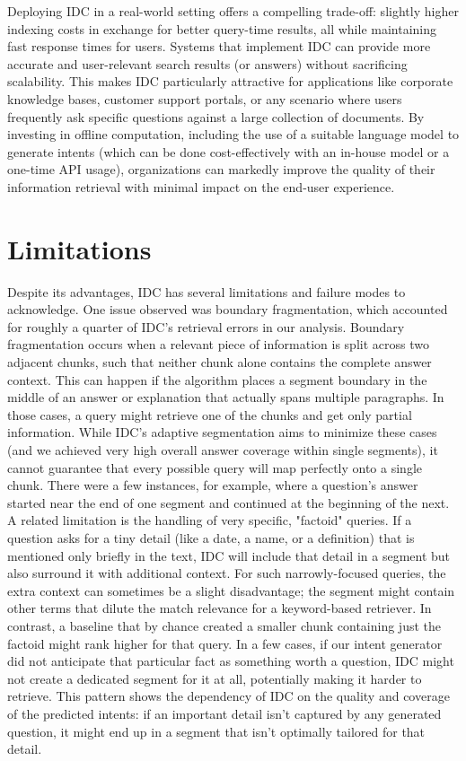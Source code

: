 \documentclass[12pt,a4paper]{report}
\begin{document}
Deploying IDC in a real-world setting offers a compelling trade-off: slightly higher indexing costs in exchange for better query-time results, all while maintaining fast response times for users. Systems that implement IDC can provide more accurate and user-relevant search results (or answers) without sacrificing scalability. This makes IDC particularly attractive for applications like corporate knowledge bases, customer support portals, or any scenario where users frequently ask specific questions against a large collection of documents. By investing in offline computation, including the use of a suitable language model to generate intents (which can be done cost-effectively with an in-house model or a one-time API usage), organizations can markedly improve the quality of their information retrieval with minimal impact on the end-user experience.

\section{Limitations}

Despite its advantages, IDC has several limitations and failure modes to acknowledge. One issue observed was boundary fragmentation, which accounted for roughly a quarter of IDC's retrieval errors in our analysis. Boundary fragmentation occurs when a relevant piece of information is split across two adjacent chunks, such that neither chunk alone contains the complete answer context. This can happen if the algorithm places a segment boundary in the middle of an answer or explanation that actually spans multiple paragraphs. In those cases, a query might retrieve one of the chunks and get only partial information. While IDC's adaptive segmentation aims to minimize these cases (and we achieved very high overall answer coverage within single segments), it cannot guarantee that every possible query will map perfectly onto a single chunk. There were a few instances, for example, where a question's answer started near the end of one segment and continued at the beginning of the next. A related limitation is the handling of very specific, "factoid" queries. If a question asks for a tiny detail (like a date, a name, or a definition) that is mentioned only briefly in the text, IDC will include that detail in a segment but also surround it with additional context. For such narrowly-focused queries, the extra context can sometimes be a slight disadvantage; the segment might contain other terms that dilute the match relevance for a keyword-based retriever. In contrast, a baseline that by chance created a smaller chunk containing just the factoid might rank higher for that query. In a few cases, if our intent generator did not anticipate that particular fact as something worth a question, IDC might not create a dedicated segment for it at all, potentially making it harder to retrieve. This pattern shows the dependency of IDC on the quality and coverage of the predicted intents: if an important detail isn't captured by any generated question, it might end up in a segment that isn't optimally tailored for that detail.
\end{document}
